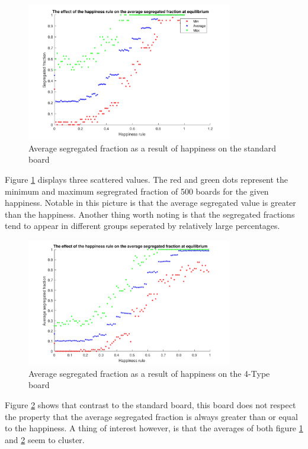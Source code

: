 \begin{figure}[H]
    \centering
    \includegraphics[width=0.8\textwidth]{habysegfrac_sb_2}
    \caption{Average segregated fraction as a result of happiness on the standard board}
    \label{fig:happysegsb}
\end{figure}

Figure \ref{fig:happysegsb} displays three scattered values. The red and green dots represent the minimum and maximum segregrated fraction of 500 boards for the given happiness. Notable in this picture is that the average segregated value is greater than the happiness. 
Another thing worth noting is that the segregated fractions tend to appear in different groups seperated by relatively large percentages.
\begin{figure}[H]
    \centering
    \includegraphics[width=0.8\textwidth]{habysegfrac_4b_2}
    \caption{Average segregated fraction as a result of happiness on the 4-Type board}
    \label{fig:happyseg4b}
\end{figure}
Figure \ref{fig:happyseg4b} shows that contrast to the standard board, this board does not respect the property that the average segregated fraction is always greater than or equal to the happiness. 
A thing of interest however, is that the averages of both figure \ref{fig:happysegsb} and \ref{fig:happyseg4b} seem to cluster.
